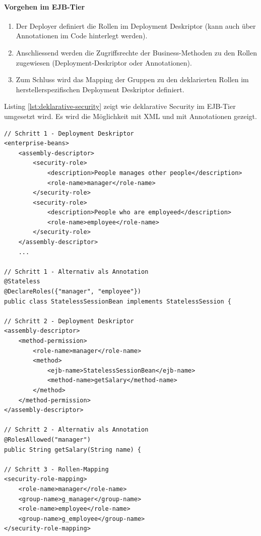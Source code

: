 \paragraph{Vorgehen im EJB-Tier}
\begin{enumerate}
	\item Der Deployer definiert die Rollen im Deployment Deskriptor (kann auch über Annotationen im Code hinterlegt werden).
	
	\item Anschliessend werden die Zugriffsrechte der Business-Methoden zu den Rollen zugewiesen (Deployment-Deskriptor oder Annotationen).
	
	\item Zum Schluss wird das Mapping der Gruppen zu den deklarierten Rollen im herstellerspezifischen Deployment Deskriptor definiert.
\end{enumerate}

Listing \ref{lst:deklarative-security} zeigt wie deklarative Security im EJB-Tier umgesetzt wird. Es wird die Möglichkeit mit XML und mit Annotationen gezeigt.

\begin{lstlisting}[caption=Deklarative Security im EJB-Tier, label=lst:deklarative-security]
// Schritt 1 - Deployment Deskriptor
<enterprise-beans>
	<assembly-descriptor>
		<security-role>
			<description>People manages other people</description>
			<role-name>manager</role-name>
		</security-role>
		<security-role>
			<description>People who are employeed</description>
			<role-name>employee</role-name>
		</security-role>
	</assembly-descriptor>
	...

// Schritt 1 - Alternativ als Annotation
@Stateless
@DeclareRoles({"manager", "employee"})
public class StatelessSessionBean implements StatelessSession {

// Schritt 2 - Deployment Deskriptor
<assembly-descriptor>
	<method-permission>
		<role-name>manager</role-name>
		<method>
			<ejb-name>StatelessSessionBean</ejb-name>
			<method-name>getSalary</method-name>
		</method>
	</method-permission>
</assembly-descriptor>

// Schritt 2 - Alternativ als Annotation
@RolesAllowed("manager")
public String getSalary(String name) {

// Schritt 3 - Rollen-Mapping
<security-role-mapping>
	<role-name>manager</role-name>
	<group-name>g_manager</group-name>
	<role-name>employee</role-name>
	<group-name>g_employee</group-name>
</security-role-mapping>
\end{lstlisting}

